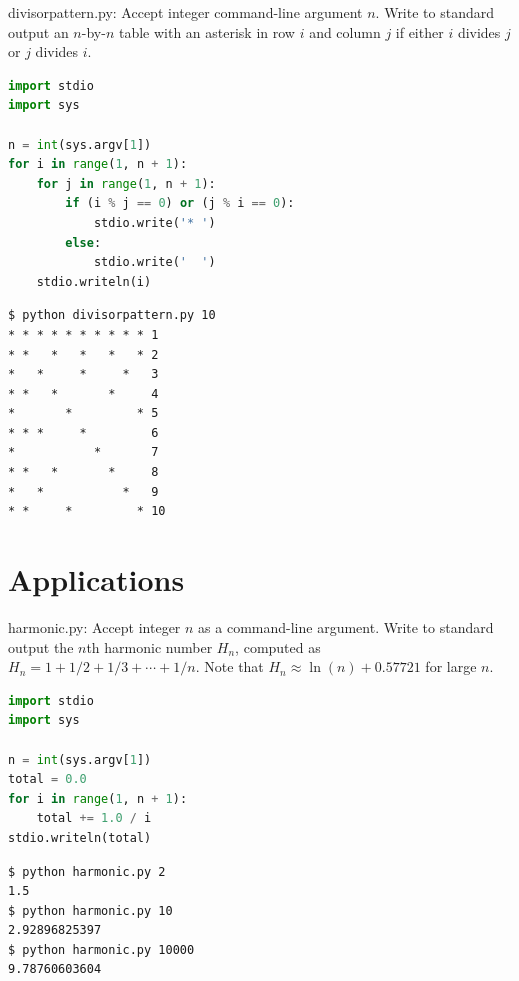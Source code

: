 \documentclass[8pt,a4paper,compress]{beamer}
\begin{document}
\begin{frame}[fragile]
\pause

\begin{framed}
\tiny divisorpattern.py: Accept integer command-line argument $n$. Write to standard output an $n$-by-$n$ table with an asterisk in row $i$ and column $j$ if either $i$ divides $j$ or $j$ divides $i$.
\end{framed}

\begin{lstlisting}[language=Python]
import stdio
import sys

n = int(sys.argv[1])
for i in range(1, n + 1):
    for j in range(1, n + 1):
        if (i % j == 0) or (j % i == 0):
            stdio.write('* ')
        else:
            stdio.write('  ')
    stdio.writeln(i)
\end{lstlisting}

\pause

\begin{lstlisting}[language={}]
$ python divisorpattern.py 10
* * * * * * * * * * 1
* *   *   *   *   * 2
*   *     *     *   3
* *   *       *     4
*       *         * 5
* * *     *         6
*           *       7
* *   *       *     8
*   *           *   9
* *     *         * 10
\end{lstlisting}
\end{frame}

\section{Applications}
\begin{frame}[fragile]
\pause

\begin{framed}
\tiny harmonic.py: Accept integer $n$ as a command-line argument. Write to standard output the $n$th harmonic number $H_n$, computed as $H_n=1+1/2+1/3+\cdots+1/n$. Note that $H_n \approx \ln(n) + 0.57721$ for large $n$.
\end{framed}

\begin{lstlisting}[language=Python]
import stdio
import sys

n = int(sys.argv[1])
total = 0.0
for i in range(1, n + 1):
    total += 1.0 / i
stdio.writeln(total)
\end{lstlisting}

\pause

\begin{lstlisting}[language={}]
$ python harmonic.py 2
1.5
$ python harmonic.py 10
2.92896825397
$ python harmonic.py 10000
9.78760603604
\end{lstlisting}
\end{frame}
\end{document}
